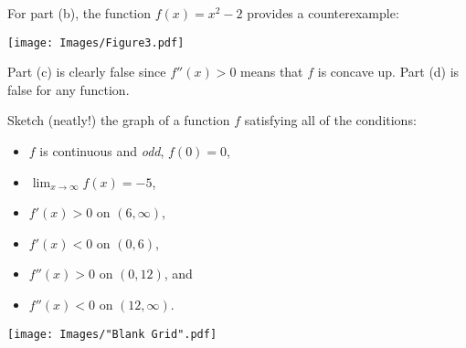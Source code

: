 \documentclass[handout,nooutcomes]{ximera}
\renewenvironment{freeResponse}{
\ifhandout\setbox0\vbox\bgroup\else
\begin{trivlist}\item[\hskip \labelsep\bfseries Solution:\hspace{2ex}]
\fi}
{\ifhandout\egroup\else
\end{trivlist}
\fi}
\begin{document}
\begin{problem}
\begin{enumerate}
\begin{freeResponse}
         For part (b), the function $f(x) = x^2 -2$ provides a counterexample:
         \begin{image}
           \texttt{[image: Images/Figure3.pdf]}
         \end{image}
			
         Part (c) is clearly false since $f''(x) > 0$ means that $f$ is concave up.
         Part (d) is false for any function.
       \end{freeResponse}
    \end{enumerate}
\end{problem}

\begin{problem}
  Sketch (neatly!) the graph of a function $f$ satisfying all of the conditions:
  \begin{itemize}
    \item[(a)]
      $f$ is continuous and \emph{odd}, $f(0) = 0$,

    \item[(b)]
      $\displaystyle \lim_{x \to \infty} f(x) = -5$,

    \item[(c)]
      $f'(x) > 0$ on $(6, \infty)$,

    \item[(d)] 
      $f'(x) < 0$ on $(0, 6)$,

    \item[(e)]
      $f''(x) > 0$ on $(0, 12)$, and
      
    \item[(f)]
      $f''(x) < 0$ on $(12, \infty)$.
  \end{itemize}
  \begin{center}
    \begin{image}
      \texttt{[image: Images/"Blank Grid".pdf]}
    \end{image}
  \end{center}
\end{problem}
\end{document}
